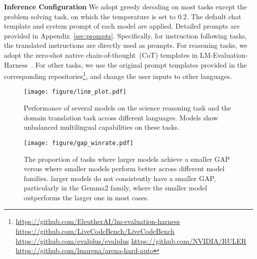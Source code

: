 \noindent\textbf{Inference Configuration}
We adopt greedy decoding on most tasks except the problem solving task, on which the temperature is set to $0.2$.
The default chat template and system prompt of each model are applied.
Detailed prompts are provided in Appendix~\ref{sec:prompts}.
Specifically, for instruction following tasks, the translated instructions are directly used as prompts.
For reasoning tasks, we adopt the zero-shot native chain-of-thought~(CoT) templates in LM-Evaluation-Harness~\cite{eval-harness}.
For other tasks, we use the original prompt templates provided in the corresponding repositories\footnote{\url{https://github.com/EleutherAI/lm-evaluation-harness} \newline
\url{https://github.com/LiveCodeBench/LiveCodeBench} \newline  
\url{https://github.com/evalplus/evalplus} \newline
\url{https://github.com/NVIDIA/RULER}\newline
\url{https://github.com/lmarena/arena-hard-auto}}, and change the user inputs to other languages.


\begin{figure*}[ht]
    \centering
    \texttt{[image: figure/line\_plot.pdf]}
    \caption{Performance of several models on the science reasoning task and the domain translation task across different languages. Models show unbalanced multilingual capabilities on these tasks.}
    \label{fig:line_plot}
\end{figure*}

\begin{figure}[ht]
    \centering
    \texttt{[image: figure/gap\_winrate.pdf]}
    \caption{The proportion of tasks where larger models achieve a smaller GAP versus where smaller models perform better across different model families. larger models do not consistently have a smaller GAP, particularly in the Gemma2 family, where the smaller model outperforms the larger one in most cases.}
    \label{fig:winrate}
\end{figure}



